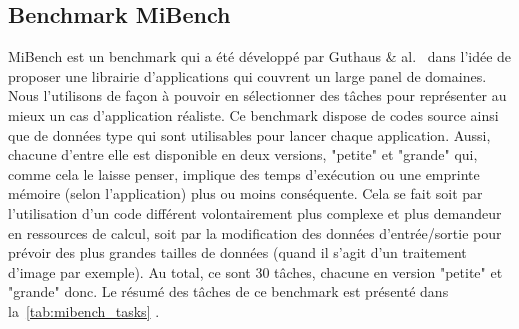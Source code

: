 \documentclass[french, a4paper, 11pt, twoside, pdftex]{StyleThese}
\begin{document}
        \subsection{Benchmark MiBench}
        MiBench est un benchmark qui a été développé par Guthaus \& al.~\cite{guthaus_mibench_2001} dans l'idée de proposer une librairie d'applications qui couvrent un large panel de domaines. Nous l'utilisons de façon à pouvoir en sélectionner des tâches pour représenter au mieux un cas d'application réaliste. 
        Ce benchmark dispose de codes source ainsi que de données type qui sont utilisables pour lancer chaque application. Aussi, chacune d'entre elle est disponible en deux versions, "petite" et "grande" qui, comme cela le laisse penser, implique des temps d'exécution ou une emprinte mémoire (selon l'application) plus ou moins conséquente. Cela se fait soit par l'utilisation d'un code différent volontairement plus complexe et plus demandeur en ressources de calcul, soit par la modification des données d'entrée/sortie pour prévoir des plus grandes tailles de données (quand il s'agit d'un traitement d'image par exemple). Au total, ce sont 30 tâches, chacune en version "petite" et "grande" donc. Le résumé des tâches de ce benchmark est présenté dans la~\autoref{tab:mibench_tasks} .
        
\end{document}
